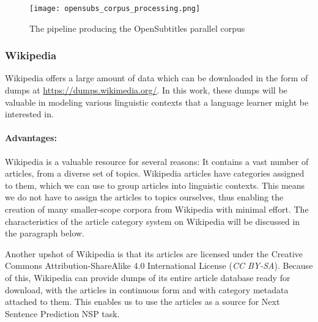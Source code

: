 \begin{figure}[H]
	\centering
	\texttt{[image: opensubs\_corpus\_processing.png]}
	\caption{The pipeline producing the OpenSubtitles parallel corpus}
	\label{fig:opensubs pipeline}
\end{figure}

\subsubsection{Wikipedia}

Wikipedia offers a large amount of data which can be downloaded in the form of dumps at \url{https://dumps.wikimedia.org/}.
In this work, these dumps will be valuable in modeling various linguistic contexts that a language learner might be interested in.

\paragraph{Advantages:}

Wikipedia is a valuable resource for several reasons:
It contains a vast number of articles, from a diverse set of topics.
Wikipedia articles have categories assigned to them, which we can use to group articles into linguistic contexts.
This means we do not have to assign the articles to topics ourselves, thus enabling the creation of many smaller-scope corpora from Wikipedia with minimal effort.
The characteristics of the article category system on Wikipedia will be discussed in the paragraph below.

Another upshot of Wikipedia is that its articles are licensed under the Creative Commons Attribution-ShareAlike 4.0 International License (\textit{CC BY-SA}).
Because of this, Wikipedia can provide dumps of its entire article database ready for download, with the articles in continuous form and with category metadata attached to them.
This enables us to use the articles as a source for Next Sentence Prediction NSP task.

